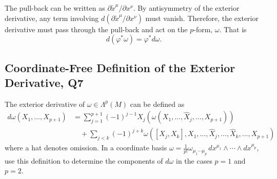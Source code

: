 \begin{solution}
    The pull-back can be written as $\partial \tilde{x}^\mu /\partial x^\nu$. By antisymmetry of the exterior derivative, any term involving $d(\partial \tilde{x}^\mu /\partial x^\nu)$ must vanish. Therefore, the exterior derivative must pass through the pull-back and act on the $p$-form, $\omega$. That is
    \begin{equation}
        d(\varphi^*\omega) = \varphi^*d\omega.
    \end{equation}
\end{solution}

\subsection{Coordinate-Free Definition of the Exterior Derivative, Q7}

The exterior derivative of $\omega\in\Lambda^p(M)$ can be defined as
\begin{equation}
\begin{aligned}
    d\omega(X_1,\ldots,X_{p+1}) &= \sum_{j=1}^{p+1}(-1)^{j-1}X_j\!\left(\omega(X_1,\ldots,\hat{X}_j,\ldots,X_{p+1})\right)\\
    &\quad +\sum_{j<k}(-1)^{j+k}\omega([X_j,X_k],X_1,\ldots,\hat{X}_j,\ldots,\hat{X}_k,\ldots,X_{p+1})
\end{aligned}
\end{equation}
where a hat denotes omission. In a coordinate basis $\omega = \frac{1}{p!}\omega_{\mu_1\cdots\mu_p}\,dx^{\mu_1}\wedge\cdots\wedge dx^{\mu_p}$, use this definition to determine the components of $d\omega$ in the cases $p=1$ and $p=2$.
